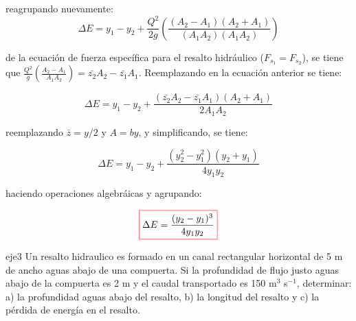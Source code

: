 \documentclass[11pt, oneside]{article}
\begin{document}
\begin{itemize}
reagrupando nuevamente:
$$
\Delta E = y_1 - y_2 + \frac{Q^2}{2g}\left(\frac{(A_2 - A_1)(A_2 + A_1)}{(A_1 A_2)(A_1 A_2)} \right)
$$

de la ecuaci\'on de fuerza espec\'ifica para el resalto hidr\'aulico ($F_{s_1} = F_{s_2}$), se tiene que $\frac{Q^2}{g} \left(\frac{A_2 - A_1}{A_1 A_2} \right) = \bar{z_2}A_2 - \bar{z_1}A_1 $. Reemplazando en la ecuaci\'on anterior se tiene:

$$
\Delta E = y_1 - y_2 + \frac{(\bar{z_2}A_2 - \bar{z_1}A_1) (A_2 + A_1)}{2 A_1 A_2}
$$

reemplazando $\bar{z}=y/2$ y $A=by$, y simplificando, se tiene:

$$
\Delta E = y_1 - y_2 + \frac{(y_2^2 - y_1^2) (y_2 + y_1)}{4 y_1 y_2}
$$

haciendo operaciones algebr\'aicas y agrupando:

\begin{equation}
\color{red}\boxed{\color{black} \Delta E = \frac{(y_2 - y_1)^3}{4y_1 y_2}}
\label{ene23}
\end{equation}
\end{itemize}

\begin{eje}{}{eje3}
    Un resalto hidraulico es formado en un canal rectangular horizontal de 5 m de ancho aguas abajo de una compuerta. Si la profundidad de flujo justo aguas abajo de la compuerta es 2 m y el caudal transportado es 150 m$^3$ s$^{-1}$, determinar: a) la profundidad aguas abajo del resalto, b) la longitud del resalto y c) la p\'erdida de energ\'ia en el resalto.
\end{eje}


\end{document}
